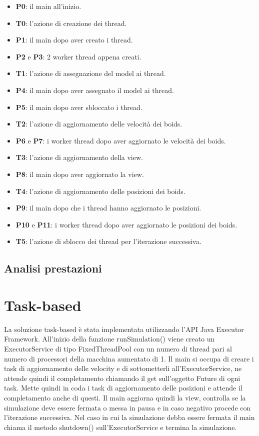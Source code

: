\documentclass[11pt,notitlepage]{article}
\begin{document}
\begin{itemize}
    \item \textbf{P0}: il main all'inizio.
    \item \textbf{T0}: l'azione di creazione dei thread.
    \item \textbf{P1}: il main dopo aver creato i thread.
    \item \textbf{P2} e \textbf{P3}: 2 worker thread appena creati.
    \item \textbf{T1}: l'azione di assegnazione del model ai thread.
    \item \textbf{P4}: il main dopo aver assegnato il model ai thread.
    \item \textbf{P5}: il main dopo aver sbloccato i thread.
    \item \textbf{T2}: l'azione di aggiornamento delle velocità dei boids.
    \item \textbf{P6} e \textbf{P7}: i worker thread dopo aver aggiornato le velocità dei boids.
    \item \textbf{T3}: l'azione di aggiornamento della view.
    \item \textbf{P8}: il main dopo aver aggiornato la view.
    \item \textbf{T4}: l'azione di aggiornamento delle posizioni dei boids.
    \item \textbf{P9}: il main dopo che i thread hanno aggiornato le posizioni.
    \item \textbf{P10} e \textbf{P11}: i worker thread dopo aver aggiornato le posizioni dei boids.
    \item \textbf{T5}: l'azione di sblocco dei thread per l'iterazione successiva.
\end{itemize}

\subsection{Analisi prestazioni}

\newpage
\section{Task-based}
La soluzione task-based è stata implementata utilizzando l'API Java Executor Framework. All'inizio della funzione \textsf{runSimulation()} viene creato un 
\textsf{ExecutorService} di tipo \textsf{FixedThreadPool} con un numero di thread pari al numero di processori della macchina aumentato di 1.
Il main si occupa di creare i task di aggiornamento delle velocity e di sottometterli all'\textsf{ExecutorService}, ne attende quindi il completamento 
chiamando il get sull'oggetto \textsf{Future} di ogni task. Mette quindi in coda i task di aggiornamento delle posizioni e attende il completamento anche di 
questi. Il main aggiorna quindi la view, controlla se la simulazione deve essere fermata o messa in pausa e in caso negativo procede con l'iterazione successiva.
Nel caso in cui la simulazione debba essere fermata il main chiama il metodo \textsf{shutdown()} sull'\textsf{ExecutorService} e termina la simulazione.
\end{document}
